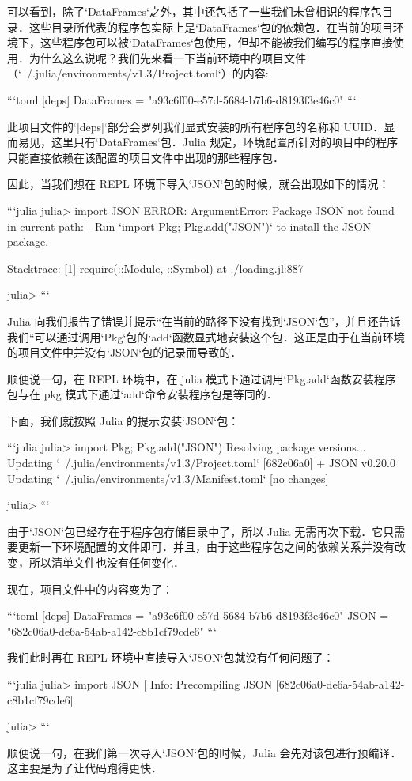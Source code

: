 可以看到，除了`DataFrames`之外，其中还包括了一些我们未曾相识的程序包目录．这些目录所代表的程序包实际上是`DataFrames`包的依赖包．在当前的项目环境下，这些程序包可以被`DataFrames`包使用，但却不能被我们编写的程序直接使用．为什么这么说呢？我们先来看一下当前环境中的项目文件（`~/.julia/environments/v1.3/Project.toml`）的内容:

```toml
[deps]
DataFrames = "a93c6f00-e57d-5684-b7b6-d8193f3e46c0"
```

此项目文件的`[deps]`部分会罗列我们显式安装的所有程序包的名称和 UUID．显而易见，这里只有`DataFrames`包．Julia 规定，环境配置所针对的项目中的程序只能直接依赖在该配置的项目文件中出现的那些程序包．

因此，当我们想在 REPL 环境下导入`JSON`包的时候，就会出现如下的情况：

```julia
julia> import JSON
ERROR: ArgumentError: Package JSON not found in current path:
- Run `import Pkg; Pkg.add("JSON")` to install the JSON package.

Stacktrace:
 [1] require(::Module, ::Symbol) at ./loading.jl:887

julia> 
```

Julia 向我们报告了错误并提示“在当前的路径下没有找到`JSON`包”，并且还告诉我们“可以通过调用`Pkg`包的`add`函数显式地安装这个包．这正是由于在当前环境的项目文件中并没有`JSON`包的记录而导致的．

顺便说一句，在 REPL 环境中，在 julia 模式下通过调用`Pkg.add`函数安装程序包与在 pkg 模式下通过`add`命令安装程序包是等同的．

下面，我们就按照 Julia 的提示安装`JSON`包：

```julia
julia> import Pkg; Pkg.add("JSON")
 Resolving package versions...
  Updating `~/.julia/environments/v1.3/Project.toml`
  [682c06a0] + JSON v0.20.0
  Updating `~/.julia/environments/v1.3/Manifest.toml`
 [no changes]

julia> 
```

由于`JSON`包已经存在于程序包存储目录中了，所以 Julia 无需再次下载．它只需要更新一下环境配置的文件即可．并且，由于这些程序包之间的依赖关系并没有改变，所以清单文件也没有任何变化．

现在，项目文件中的内容变为了：

```toml
[deps]
DataFrames = "a93c6f00-e57d-5684-b7b6-d8193f3e46c0"
JSON = "682c06a0-de6a-54ab-a142-c8b1cf79cde6"
```

我们此时再在 REPL 环境中直接导入`JSON`包就没有任何问题了：

```julia
julia> import JSON
[ Info: Precompiling JSON [682c06a0-de6a-54ab-a142-c8b1cf79cde6]

julia> 
```

顺便说一句，在我们第一次导入`JSON`包的时候，Julia 会先对该包进行预编译．这主要是为了让代码跑得更快．